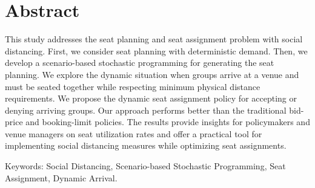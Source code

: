 
\section*{Abstract}
This study addresses the seat planning and seat assignment problem with social distancing. First, we consider seat planning with deterministic demand. Then, we develop a scenario-based stochastic programming for generating the seat planning. We explore the dynamic situation when groups arrive at a venue and must be seated together while respecting minimum physical distance requirements. We propose the dynamic seat assignment policy for accepting or denying arriving groups. Our approach performs better than the traditional bid-price and booking-limit policies. The results provide insights for policymakers and venue managers on seat utilization rates and offer a practical tool for implementing social distancing measures while optimizing seat assignments.


Keywords: Social Distancing, Scenario-based Stochastic Programming, Seat Assignment, Dynamic Arrival.


